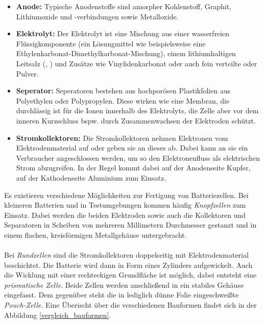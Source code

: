 \documentclass[a4paper, 11pt, headsepline,footsepline,twoside,abstract]{scrbook}
\begin{document}
\begin{itemize}
\item \textbf{Anode:} Typische Anodenstoffe sind amorpher Kohlenstoff, Graphit, Lithiumoxide und -verbind\-ungen sowie Metalloxide. 
\item \textbf{Elektrolyt:}  Der Elektrolyt ist eine Mischung aus einer wasserfreien Flüssigkomponente (ein Lösungmittel wie beispielsweise eine Ethylenkarbonat-Dimethylkarbonat-Mischung), einem lithiumhaltigen Leitsalz (, ) und Zusätze wie Vinylidenkarbonat oder auch fein verteilte  oder  Pulver.
\item \textbf{Seperator:}  Seperatoren bestehen aus hochporösen Plastikfolien aus Polyethylen oder Polypropylen. Diese wirken wie eine Membran, die durchlässig ist für die Ionen innerhalb des Elektrolyts, die Zelle aber vor dem inneren Kurzschluss bspw. durch Zusammenwachsen der Elektroden schützt.
\item \textbf{Stromkollektoren:} Die Stromkollektoren nehmen Elektronen vom Elektrodenmaterial auf oder geben sie an dieses ab. Dabei kann an sie ein Verbraucher angeschlossen werden, um so den Elektronenfluss als elektrischen Strom abzugreifen. In der Regel kommt dabei auf der Anodenseite Kupfer, auf der Kathodenseite Aluminium zum Einsatz.
\end{itemize}
Es existieren verschiedene Möglichkeiten zur Fertigung von Batteriezellen. Bei kleineren Batterien und in Testumgebungen kommen häufig \textit{Knopfzellen} zum Einsatz. Dabei werden die beiden Elektroden sowie auch die Kollektoren und Separatoren in Scheiben von mehreren Millimetern Durchmesser gestanzt und in einem flachen, kreisförmigen Metallgehäuse untergebracht. 
\\\\
Bei \textit{Rundzellen} sind die Stromkollektoren doppelseitig mit Elektrodenmaterial beschichtet. Die Batterie wird dann in Form eines Zylinders aufgewickelt. Auch die Wicklung mit einer rechteckigen Grundfläche ist möglich, dabei entsteht eine \textit{prismatische Zelle}. Beide Zellen werden anschließend in ein stabiles Gehäuse eingefasst. Dem gegenüber steht die in lediglich dünne Folie eingeschweißte \textit{Pouch-Zelle}. Eine Überischt über die verschiedenen Bauformen findet sich in der Abbildung \ref{vergleich_bauformen}.
\end{document}
